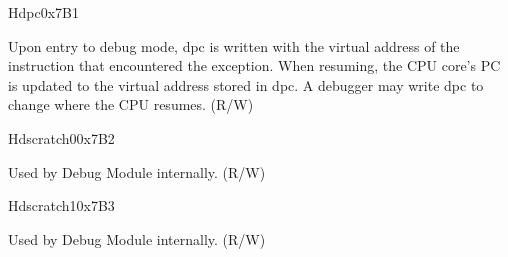 \begin{register}{H}{dpc}{0x7B1}
\label{regdesc:DPC}
%
\regnewline%
\begin{regdesc}
\begin{reglist}
\label{fielddesc:DPC}\item [dpc] Upon entry to debug mode, dpc is written with the virtual address of the instruction that encountered the exception. When resuming, the CPU core's PC is updated to the virtual address stored in dpc. A debugger may write dpc to change where the CPU resumes. (R/W)
\end{reglist}
\end{regdesc}
\end{register}

\begin{register}{H}{dscratch0}{0x7B2}
\label{regdesc:DSCRATCH0}
%
\regnewline%
\begin{regdesc}
\begin{reglist}
\label{fielddesc:DSCRATCH0}\item [dscratch0] Used by Debug Module internally. (R/W)
\end{reglist}
\end{regdesc}
\end{register}

\begin{register}{H}{dscratch1}{0x7B3}
\label{regdesc:DSCRATCH1}
%
\regnewline%
\begin{regdesc}
\begin{reglist}
\label{fielddesc:DSCRATCH1}\item [dscratch1] Used by Debug Module internally. (R/W)
\end{reglist}
\end{regdesc}
\end{register}